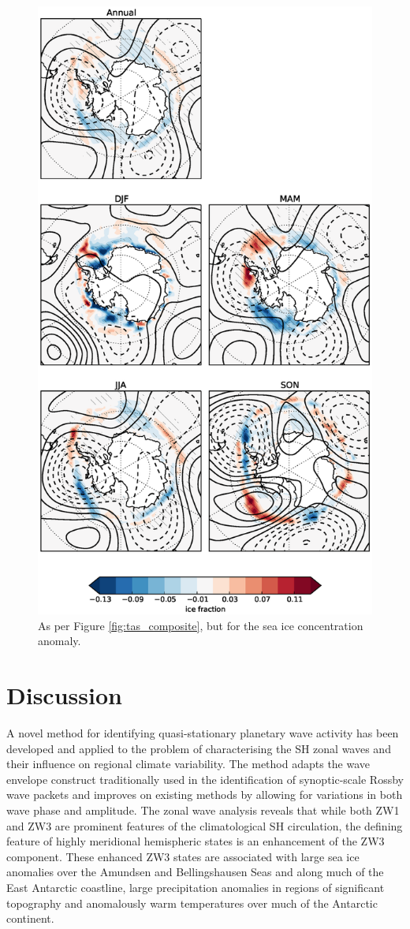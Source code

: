 \begin{figure}
\begin{center}
\includegraphics[width=0.63\columnwidth]{figures/zonalwaves/sic-composite_pwigt90pct_ERAInterim_500hPa_030day-runmean-anom-wrt-all_native-shextropics15.eps}
\caption{\label{fig:sic_composite}
As per Figure \ref{fig:tas_composite}, but for the sea ice concentration anomaly.}
\end{center}
\end{figure}    
 

\section{Discussion}


A novel method for identifying quasi-stationary planetary wave activity has been developed and applied to the problem of characterising the SH zonal waves and their influence on regional climate variability. The method adapts the wave envelope construct traditionally used in the identification of synoptic-scale Rossby wave packets and improves on existing methods by allowing for variations in both wave phase and amplitude. The zonal wave analysis reveals that while both ZW1 and ZW3 are prominent features of the climatological SH circulation, the defining feature of highly meridional hemispheric states is an enhancement of the ZW3 component. These enhanced ZW3 states are associated with large sea ice anomalies over the Amundsen and Bellingshausen Seas and along much of the East Antarctic coastline, large precipitation anomalies in regions of significant topography and anomalously warm temperatures over much of the Antarctic continent. 

